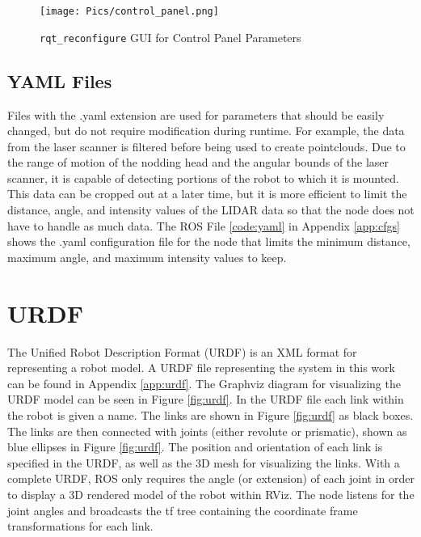 \begin{figure}[h]
    \centering
    \texttt{[image: Pics/control\_panel.png]}
    \caption{\texttt{rqt\_reconfigure} GUI for Control Panel Parameters}
    \label{fig:cpgui}
\end{figure}

\subsection{YAML Files}
Files with the .yaml extension are used for parameters that should be easily changed, but do not require modification during runtime. For example, the data from the laser scanner is filtered before being used to create pointclouds. Due to the range of motion of the nodding head and the angular bounds of the laser scanner, it is capable of detecting portions of the robot to which it is mounted. This data can be cropped out at a later time, but it is more efficient to limit the distance, angle, and intensity values of the LIDAR data so that the  node does not have to handle as much data. The ROS File \ref{code:yaml} in Appendix \ref{app:cfgs} shows the .yaml configuration file for the  node that limits the minimum distance, maximum angle, and maximum intensity values to keep.\\

\section{URDF}
The Unified Robot Description Format (URDF) is an XML format for representing a robot model. A URDF file representing the system in this work can be found in Appendix \ref{app:urdf}. The Graphviz diagram for visualizing the URDF model can be seen in Figure \ref{fig:urdf}. In the URDF file each link within the robot is given a name. The links are shown in Figure \ref{fig:urdf} as black boxes. The links are then connected with joints (either revolute or prismatic), shown as blue ellipses in Figure \ref{fig:urdf}. The position and orientation of each link is specified in the URDF, as well as the 3D mesh for visualizing the links. With a complete URDF, ROS only requires the angle (or extension) of each joint in order to display a 3D rendered model of the robot within RViz. The  node listens for the joint angles and broadcasts the tf tree containing the coordinate frame transformations for each link.\\

